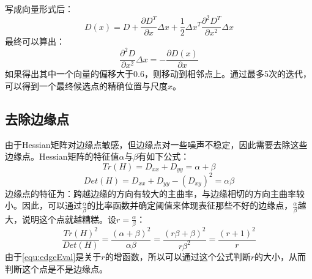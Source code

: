       写成向量形式后：
      \begin{equation}
        D(x)=D+\frac{\partial D^T}{\partial x}\Delta x+\frac{1}{2}\Delta x^T\frac{\partial^2D^T}{\partial x^2}\Delta x
      \end{equation}
      最终可以算出：
      \begin{equation}
        \frac{\partial^2D}{\partial x^2}\Delta x=-\frac{\partial D(x)}{\partial x}
      \end{equation}
      如果得出其中一个向量的偏移大于0.6，则移动到相邻点上。通过最多5次的迭代，可以得到一个最终候选点的精确位置与尺度$\hat{x}$。
    \subsection{去除边缘点}
      由于Hessian矩阵对边缘点敏感，但边缘点对一些噪声不稳定，因此需要去除这些边缘点。Hessian矩阵的特征值$\alpha$与$\beta$有如下公式：
      \begin{equation}
        Tr(H)=D_{xx}+D_{yy}=\alpha+\beta
      \end{equation}
      \begin{equation}
        Det(H)=D_{xx}+D_{yy}-\left(D_{xy}\right)^2=\alpha\beta
      \end{equation}
      边缘点的特征为：跨越边缘的方向有较大的主曲率，与边缘相切的方向主曲率较小。因此，可以通过$\frac{\alpha}{\beta}$的比率函数并确定阈值来体现表征那些不好的边缘点，$\frac{\alpha}{\beta}$越大，说明这个点就越糟糕。设$r=\frac{\alpha}{\beta}$：
      \begin{equation}
        \label{equ:edgeEval}
        \frac{Tr(H)^2}{Det(H)}=\frac{\left(\alpha+\beta\right)^2}{\alpha\beta}=\frac{\left(r\beta+\beta\right)^2}{r\beta^2}=\frac{\left(r+1\right)^2}{r}
      \end{equation}
      由于\ref{equ:edgeEval}是关于$r$的增函数，所以可以通过这个公式判断$r$的大小，从而判断这个点是不是边缘点。
